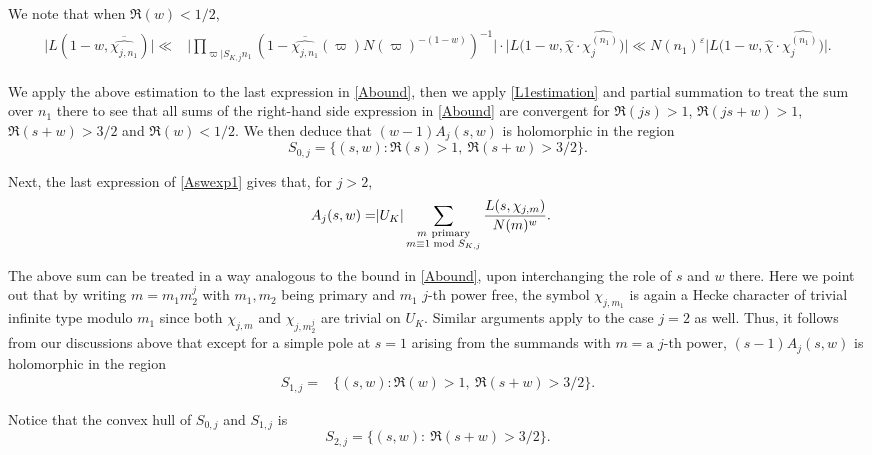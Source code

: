 \documentclass[twoside,leqno,10pt, A4]{amsart}
\begin{document}
  We note that when $\Re(w) < 1/2$,
\begin{align}
\label{L1wbound}
\begin{split}
		\big |L(1- w, \overline{\widehat{\chi_{j, n_1}}}) \big | \ll &	\big|\prod_{\varpi | S_{K,j}n_1}(1-\overline{\widehat{\chi_{j, n_1}}}(\varpi)N(\varpi)^{-(1-w)})^{-1}\big| \cdot
\big| L(1-w, \widehat{\chi} \cdot \widehat{\chi^{(n_1)}_j)}\big| \ll N(n_1)^{\varepsilon}\big| L(1-w, \widehat{\chi} \cdot \widehat{\chi^{(n_1)}_j)}\big|.
\end{split}
\end{align}

  We apply the above estimation to the last expression in \eqref{Abound}, then we apply \eqref{L1estimation} and partial summation to treat the sum over $n_1$ there to see that all sums of the right-hand side expression in \eqref{Abound} are convergent for $\Re(js)>1$, $\Re(js+w)>1$, $\Re(s+w)>3/2$ and
$\Re(w) < 1/2$.  We then deduce that $(w-1)A_j(s,w)$ is holomorphic in the region
\begin{equation*}
		S_{0,j}=\{(s,w): \Re(s)>1, \ \Re(s+w)>3/2\}.
\end{equation*}

 Next, the last expression of \eqref{Aswexp1} gives that, for $j>2$,
\begin{align} \label{Sum A(s,w,z) over n}		
A_j(s,w)=& |U_K|\sum_{\substack{ m\mathrm{\ primary} \\ m \equiv 1 \bmod {S_{K,j}} } } \frac{L(s, \chi_{j,m})}{N(m)^w}.
\end{align}

The above sum can be treated in a way analogous to the bound in \eqref{Abound}, upon interchanging the role
of $s$ and $w$ there. Here we point out that by writing $m=m_1m^j_2$ with $m_1, m_2$ being primary and $m_1$ $j$-th power free, the symbol $\chi_{j,m_1}$ is again a Hecke character of trivial infinite type modulo $m_1$ since both $\chi_{j,m}$ and $\chi_{j,m^{j}_2}$ are trivial on $U_K$.    Similar arguments apply to the case $j=2$ as well. Thus, it follows from our discussions above that except for a simple pole at $s=1$ arising from the summands with $m=
\text{a $j$-th power}$, $(s-1)A_j(s,w)$ is holomorphic in the region
\begin{align*}
		S_{1,j}=& \{(s,w): \Re(w)>1, \ \Re(s+w)>3/2\}.
\end{align*}

 Notice that the convex hull of $S_{0,j}$ and $S_{1,j}$ is
\begin{equation*}
		S_{2,j}=\{(s,w):\ \Re(s+w)> 3/2 \}.
\end{equation*}
\end{document}

